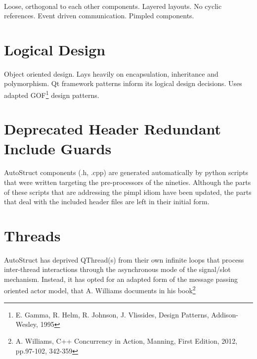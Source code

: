\paragraph{}
Loose, orthogonal to each other components. Layered layouts. No cyclic references. Event driven communication. Pimpled components.
\section{Logical Design}
\paragraph{}
Object oriented design. Lays heavily on encapsulation, inheritance and polymorphism. Qt framework patterns inform its logical design decisions. Uses adapted GOF\footnote{E. Gamma, R. Helm, R. Johnson, J. Vlissides, Design Patterns, Addison-Wesley, 1995} design patterns.
\section{Deprecated Header Redundant Include Guards}
\paragraph{}
AutoStruct components (.h, .cpp) are generated automatically by python scripts that were written targeting the pre-processors of the nineties. Although the parts of these scripts that are addressing the pimpl idiom have been updated, the parts that deal with the included header files are left in their initial form.
\section{Threads}
\paragraph{}
AutoStruct has deprived QThread(s) from their own infinite loops that process inter-thread interactions through the asynchronous mode of the signal/slot mechanism. Instead, it has opted for an adapted form of the message passing oriented actor model, that A. Williams documents in his book\footnote{A. Williams, C++ Concurrency in Action, Manning, First Edition, 2012, pp.97-102, 342-359}
